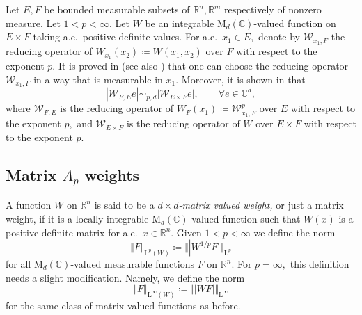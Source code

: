 \documentclass{article}
\theoremstyle{definition}
\theoremstyle{remark}
\numberwithin{equation}{section}
\newcommand{\mathdm}{\,\mathrm{dm}}
\newcommand{\cW}{\mathcal{W}}
\newcommand{\reals}{\mathbb{R}}
\newcommand{\complex}{\mathbb{C}}
\newcommand{\Lp}[1]{\mathrm{L}^{#1}}
\newcommand{\1}{\mathbf{1}}
\begin{document}
    
    Let $E,F$ be bounded measurable subsets of $\reals^n,\reals^m$ respectively of nonzero measure. Let $1<p<\infty.$ Let $W$ be an integrable $\mathrm{M}_{d}(\complex)$-valued function on $E\times F$ taking a.e.~positive definite values. For a.e.~$x_1\in E,$ denote by $\cW_{x_1,F}$ the reducing operator of $W_{x_1}(x_2)\coloneq W(x_1,x_2)$ over $F$ with respect to the exponent $p.$
    It is proved in \cite{DKPS2024} (see also \cite{Cruz_Uribe_Bownik_Extrapolation}) that one can choose the reducing operator $\cW_{x_1,F}$ in a way that is measurable in $x_1.$
    Moreover, it is shown in \cite{DKPS2024} that
    \begin{equation}
        \label{iterate reducing operators}
        |\cW_{F,E}e|\sim_{p,d}|\cW_{E\times F}e|,\qquad\forall e\in\complex^d,
    \end{equation}
    where $\cW_{F,E}$ is the reducing operator of $W_{F}(x_1)\coloneq \cW_{x_1,F}^{p}$ over $E$ with respect to the exponent $p,$ and $\cW_{E\times F}$ is the reducing operator of $W$ over $E\times F$ with respect to the exponent $p.$

    \subsection{Matrix \texorpdfstring{$A_p$}{Ap} weights}
    \label{sec:MatrixAp}

    A function $W$ on $\reals^n$ is said to be a \emph{$d\times d$-matrix valued weight,} or just a matrix weight, if
    it is a locally integrable $\mathrm{M}_{d}(\complex)$-valued function such that $W(x)$ is a positive-definite matrix for a.e.~$x\in\reals^n.$ Given $1 < p < \infty$ we define the norm
    \begin{equation*}
        \Vert F\Vert_{\Lp{p}(W)} \coloneq \Vert |W^{1/p}F|\Vert_{\mathrm{L}^{p}}
    \end{equation*}
    for all $\mathrm{M}_{d}(\complex)$-valued measurable functions $F$ on $\reals^n.$
    For $p = \infty,$ this definition needs a slight modification.
    Namely, we define the norm
    \begin{equation*}
        \Vert F\Vert_{\Lp{\infty}(W)} \coloneq \Vert |WF|\Vert_{\mathrm{L}^{\infty}}
    \end{equation*}
    for the same class of matrix valued functions as before.
\end{document}
